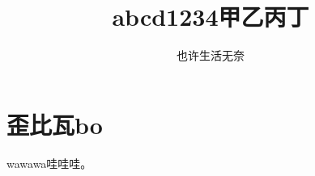 \documentclass{ctexart}
\begin{document}
\title{abcd1234甲乙丙丁}
\author[]{也许生活无奈}
\date{}
\maketitle

\section{歪比瓦bo}\label{intro}

wawawa哇哇哇。
\end{document}
